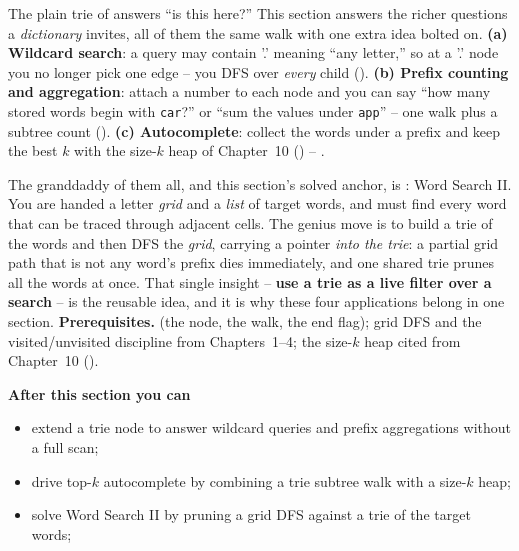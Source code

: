 \begin{topicintro}
The plain trie of  answers ``is this here?'' This section answers the richer
questions a \emph{dictionary} invites, all of them the same walk with one extra idea bolted on.
\textbf{(a) Wildcard search}: a query may contain '.' meaning ``any letter,'' so at a '.' node you no
longer pick one edge -- you DFS over \emph{every} child (). \textbf{(b) Prefix
counting and aggregation}: attach a number to each node and you can say ``how many stored words begin
with \texttt{car}?'' or ``sum the values under \texttt{app}'' -- one walk plus a subtree count
(). \textbf{(c) Autocomplete}: collect the words under a prefix and keep the best
$k$ with the size-$k$ heap of Chapter~10 () -- .

The granddaddy of them all, and this section's solved anchor, is : Word Search
II. You are handed a letter \emph{grid} and a \emph{list} of target words, and must find every word that
can be traced through adjacent cells. The genius move is to build a trie of the words and then DFS the
\emph{grid}, carrying a pointer \emph{into the trie}: a partial grid path that is not any word's prefix
dies immediately, and one shared trie prunes all the words at once. That single insight -- \textbf{use a
trie as a live filter over a search} -- is the reusable idea, and it is why these four applications
belong in one section.
\textbf{Prerequisites.}  (the node, the walk, the end flag); grid DFS and the
visited/unvisited discipline from Chapters~1--4; the size-$k$ heap cited from Chapter~10 ().

\textbf{After this section you can}
\begin{itemize}[nosep]
  \item extend a trie node to answer wildcard queries and prefix aggregations without a full scan;
        \hfill{}
  \item drive top-$k$ autocomplete by combining a trie subtree walk with a size-$k$ heap; \hfill{}
  \item solve Word Search II by pruning a grid DFS against a trie of the target words; \hfill{}
\end{itemize}
\end{topicintro}

